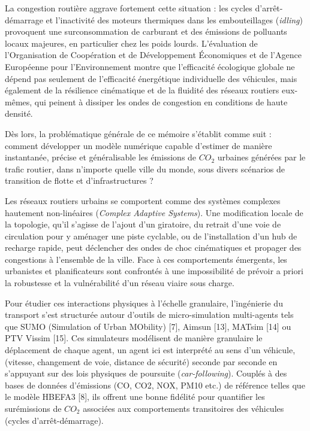 \documentclass[10pt, a4paper]{article}
\begin{document}
La congestion routière aggrave fortement cette situation : les cycles
d'arrêt-démarrage et l'inactivité des moteurs thermiques dans les
embouteillages (\emph{idling}) provoquent une surconsommation de
carburant et des émissions de polluants locaux majeures, en particulier
chez les poids lourds. L'évaluation de l'Organisation de Coopération et
de Développement Économiques et de l'Agence Européenne pour
l'Environnement montre que l'efficacité écologique globale ne dépend pas
seulement de l'efficacité énergétique individuelle des véhicules, mais
également de la résilience cinématique et de la fluidité des réseaux
routiers eux-mêmes, qui peinent à dissiper les ondes de congestion en
conditions de haute densité.

Dès lors, la problématique générale de ce mémoire s'établit comme suit :
comment développer un modèle numérique capable d'estimer de manière
instantanée, précise et généralisable les émissions de \(CO_2\) urbaines
générées par le trafic routier, dans n'importe quelle ville du monde,
sous divers scénarios de transition de flotte et d'infrastructures ?

Les réseaux routiers urbains se comportent comme des systèmes complexes
hautement non-linéaires (\emph{Complex Adaptive Systems}). Une
modification locale de la topologie, qu'il s'agisse de l'ajout d'un
giratoire, du retrait d'une voie de circulation pour y aménager une
piste cyclable, ou de l'installation d'un hub de recharge rapide, peut
déclencher des ondes de choc cinématiques et propager des congestions à
l'ensemble de la ville. Face à ces comportements émergents, les
urbanistes et planificateurs sont confrontés à une impossibilité de
prévoir a priori la robustesse et la vulnérabilité d'un réseau viaire
sous charge.

Pour étudier ces interactions physiques à l'échelle granulaire,
l'ingénierie du transport s'est structurée autour d'outils de
micro-simulation multi-agents tels que SUMO (Simulation of Urban
MObility) {[}7{]}, Aimsun {[}13{]}, MATsim {[}14{]} ou PTV Vissim
{[}15{]}. Ces simulateurs modélisent de manière granulaire le
déplacement de chaque agent, un agent ici est interprété au sens d'un
véhicule, (vitesse, changement de voie, distance de sécurité) seconde
par seconde en s'appuyant sur des lois physiques de poursuite
(\emph{car-following}). Couplés à des bases de données d'émissions (CO,
CO2, NOX, PM10 etc.) de référence telles que le modèle HBEFA3 {[}8{]},
ils offrent une bonne fidélité pour quantifier les surémissions de
\(CO_2\) associées aux comportements transitoires des véhicules (cycles
d'arrêt-démarrage).
\end{document}
